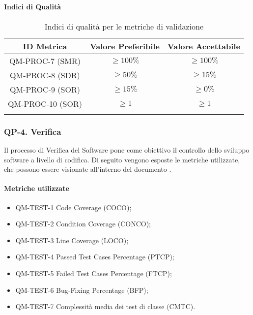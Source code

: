 		\paragraph{Indici di Qualità}

			\begin{center}
				\begin{longtable}{|c|c|c|}
				\hline
				\rowcolor{lighter-grayer}
				\textbf{ID Metrica} & \textbf{Valore Preferibile} & \textbf{Valore Accettabile}\\
				\hline
				\endfirsthead
				\hline
				QM-PROC-7 (SMR) & \(\geq 100\%\) & \(\geq 100\%\) \\
				\hline
				QM-PROC-8 (SDR) & \(\geq 50\%\) & \(\geq 15\%\) \\
				\hline
				QM-PROC-9 (SOR) & \(\geq 15\%\) & \(\geq 0\%\) \\
				\hline
				QM-PROC-10 (SOR) & \(\geq 1\) & \(\geq 1\) \\
				\hline
				\caption{Indici di qualità per le metriche di validazione}
				\end{longtable}
			\end{center}

	\subsubsection{QP-4. Verifica}

		Il processo di Verifica del Software pone come obiettivo il controllo dello sviluppo software a livello di codifica.
		Di seguito vengono esposte le metriche utilizzate, che possono essere visionate all'interno del documento .

		\paragraph{Metriche utilizzate}

			\begin{itemize}
				\item QM-TEST-1 Code Coverage (COCO);
				\item QM-TEST-2 Condition Coverage (CONCO);
				\item QM-TEST-3 Line Coverage (LOCO);
				\item QM-TEST-4 Passed Test Cases Percentage (PTCP);
				\item QM-TEST-5 Failed Test Cases Percentage (FTCP);
				\item QM-TEST-6 Bug-Fixing Percentage (BFP);
				\item QM-TEST-7 Complessità media dei test di classe (CMTC).
			\end{itemize}


